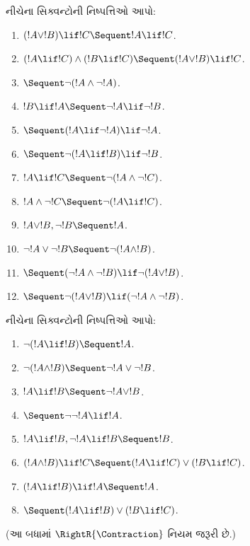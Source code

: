 \begin{prob}
નીચેના સિક્વન્ટોની નિષ્પત્તિઓ આપો:
\begin{enumerate}
\item $(!A \lor !B) \lif !C \Sequent !A \lif !C$.
\item $(!A \lif !C) \land (!B \lif !C) \Sequent (!A \lor !B) \lif !C$.
\item $\Sequent \lnot(!A \land \lnot !A)$.
\item $!B \lif !A \Sequent \lnot !A \lif \lnot !B$.
\item $\Sequent (!A \lif \lnot !A) \lif \lnot !A$.
\item $\Sequent \lnot(!A \lif !B) \lif \lnot !B$.
\item $!A \lif !C \Sequent \lnot (!A \land \lnot !C)$.
\item $!A \land \lnot !C \Sequent \lnot (!A \lif !C)$.
\item $!A \lor !B, \lnot !B \Sequent !A$.
\item $\lnot !A \lor \lnot !B \Sequent \lnot(!A \land !B)$.
\item $\Sequent (\lnot !A \land \lnot !B) \lif\lnot(!A \lor !B)$.
\item $\Sequent \lnot(!A \lor !B) \lif (\lnot !A \land \lnot !B)$.
\end{enumerate}
\end{prob}

\begin{prob}
નીચેના સિક્વન્ટોની નિષ્પત્તિઓ આપો:
\begin{enumerate}
\item $\lnot(!A \lif !B) \Sequent !A$.
\item $\lnot(!A \land !B) \Sequent \lnot !A \lor \lnot !B$.
\item $!A \lif !B \Sequent \lnot !A \lor !B$.
\item $\Sequent \lnot \lnot !A \lif !A$.
\item $!A \lif !B, \lnot !A \lif !B \Sequent !B$.
\item $(!A \land !B) \lif !C \Sequent (!A \lif !C) \lor (!B \lif !C)$.
\item $(!A \lif !B) \lif !A \Sequent !A$.
\item $\Sequent (!A \lif !B) \lor (!B \lif !C)$.
\end{enumerate}
(આ બધામાં $\RightR{\Contraction}$ નિયમ જરૂરી છે.)
\end{prob}
\endgroup


%
  \begingroup
\makeatletter{}\makeatother

